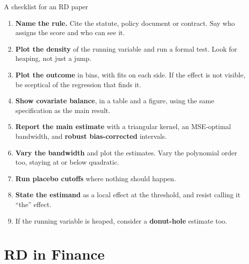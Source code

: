 \documentclass[
  11pt,
  ignorenonframetext,
  aspectratio=169,
]{beamer}
\providecommand{\tightlist}{%
  \setlength{\itemsep}{0pt}\setlength{\parskip}{0pt}}
\begin{document}
\begin{frame}{A checklist for an RD paper}
\protect{}\label{a-checklist-for-an-rd-paper}
\small

\begin{enumerate}
\tightlist
\item
  \textbf{Name the rule.} Cite the statute, policy document or contract.
  Say who assigns the score and who can see it.
\item
  \textbf{Plot the density} of the running variable and run a formal
  test. Look for heaping, not just a jump.
\item
  \textbf{Plot the outcome} in bins, with fits on each side. If the
  effect is not visible, be sceptical of the regression that finds it.
\item
  \textbf{Show covariate balance}, in a table and a figure, using the
  same specification as the main result.
\item
  \textbf{Report the main estimate} with a triangular kernel, an
  MSE-optimal bandwidth, and \textbf{robust bias-corrected} intervals.
\item
  \textbf{Vary the bandwidth} and plot the estimates. Vary the
  polynomial order too, staying at or below quadratic.
\item
  \textbf{Run placebo cutoffs} where nothing should happen.
\item
  \textbf{State the estimand} as a local effect at the threshold, and
  resist calling it ``the'' effect.
\item
  If the running variable is heaped, consider a \textbf{donut-hole}
  estimate too.
\end{enumerate}
\end{frame}

\section{RD in Finance}\label{rd-in-finance}
\end{document}

